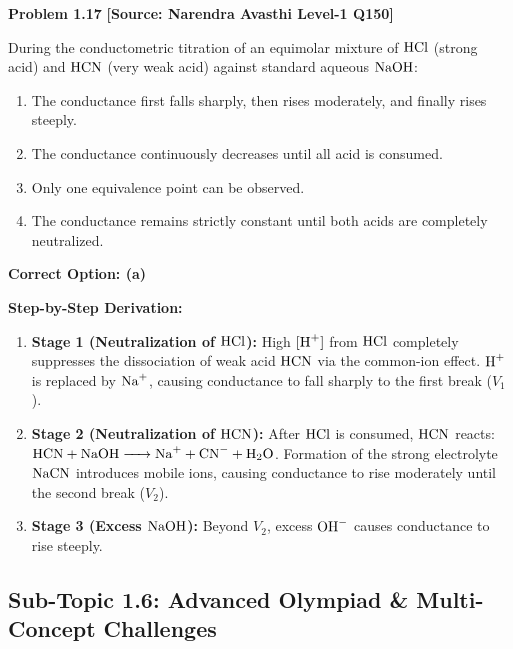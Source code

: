 \begin{problembox}
\textbf{Problem 1.17} \hfill \textbf{[Source: Narendra Avasthi Level-1 Q150]}

During the conductometric titration of an equimolar mixture of $\ce{HCl}$ (strong acid) and $\ce{HCN}$ (very weak acid) against standard aqueous $\ce{NaOH}$:
\begin{enumerate}[label=(\alph*)]
    \item The conductance first falls sharply, then rises moderately, and finally rises steeply.
    \item The conductance continuously decreases until all acid is consumed.
    \item Only one equivalence point can be observed.
    \item The conductance remains strictly constant until both acids are completely neutralized.
\end{enumerate}
\end{problembox}
\begin{solution}
\textbf{Correct Option: (a)}

\textbf{Step-by-Step Derivation:}
\begin{enumerate}[leftmargin=*]
    \item \textbf{Stage 1 (Neutralization of $\ce{HCl}$):} High $[\ce{H+}]$ from $\ce{HCl}$ completely suppresses the dissociation of weak acid $\ce{HCN}$ via the common-ion effect. $\ce{H+}$ is replaced by $\ce{Na+}$, causing conductance to fall sharply to the first break ($V_1$).
    \item \textbf{Stage 2 (Neutralization of $\ce{HCN}$):} After $\ce{HCl}$ is consumed, $\ce{HCN}$ reacts: $\ce{HCN + NaOH -> Na+ + CN- + H2O}$. Formation of the strong electrolyte $\ce{NaCN}$ introduces mobile ions, causing conductance to rise moderately until the second break ($V_2$).
    \item \textbf{Stage 3 (Excess $\ce{NaOH}$):} Beyond $V_2$, excess $\ce{OH-}$ causes conductance to rise steeply.
\end{enumerate}
\end{solution}

\subsection{Sub-Topic 1.6: Advanced Olympiad \& Multi-Concept Challenges}

